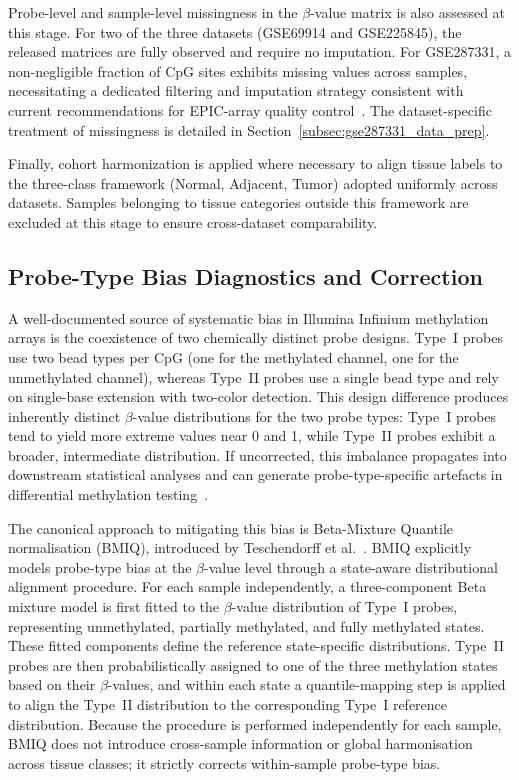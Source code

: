 Probe-level and sample-level missingness in the $\beta$-value matrix is 
also assessed at this stage. For two of the three datasets (GSE69914 and 
GSE225845), the released matrices are fully observed and require no 
imputation. For GSE287331, a non-negligible fraction of CpG sites exhibits 
missing values across samples, necessitating a dedicated filtering and 
imputation strategy consistent with current recommendations for 
EPIC-array quality control~\cite{islam2019_pediatric_dnamm, mansell2019guidance}. The 
dataset-specific treatment of missingness is detailed in 
Section~\ref{subsec:gse287331_data_prep}.

Finally, cohort harmonization is applied where necessary to align tissue 
labels to the three-class framework (Normal, Adjacent, Tumor) adopted 
uniformly across datasets. Samples belonging to tissue categories outside 
this framework are excluded at this stage to ensure cross-dataset 
comparability.

\subsection{Probe-Type Bias Diagnostics and Correction}
\label{subsec:step1}

A well-documented source of systematic bias in Illumina Infinium 
methylation arrays is the coexistence of two chemically distinct probe 
designs. Type~I probes use two bead types per CpG (one for the methylated 
channel, one for the unmethylated channel), whereas Type~II probes use a 
single bead type and rely on single-base extension with two-color 
detection. This design difference produces inherently distinct 
$\beta$-value distributions for the two probe types: Type~I probes tend 
to yield more extreme values near 0 and 1, while Type~II probes exhibit 
a broader, intermediate distribution. If uncorrected, this imbalance 
propagates into downstream statistical analyses and can generate 
probe-type-specific artefacts in differential methylation 
testing~\cite{Teschendorff2013BMIQ, maksimovic2012}.

The canonical approach to mitigating this bias is Beta-Mixture Quantile 
normalisation (BMIQ), introduced by Teschendorff et 
al.~\cite{Teschendorff2013BMIQ}. BMIQ explicitly models probe-type bias 
at the $\beta$-value level through a state-aware distributional alignment 
procedure. For each sample independently, a three-component Beta mixture model is 
first fitted to the $\beta$-value distribution of Type~I probes, 
representing unmethylated, partially methylated, and fully methylated 
states. These fitted components define the reference state-specific 
distributions. Type~II probes are then probabilistically assigned to one 
of the three methylation states based on their $\beta$-values, and within 
each state a quantile-mapping step is applied to align the Type~II 
distribution to the corresponding Type~I reference distribution. Because the procedure is performed independently for each sample, BMIQ 
does not introduce cross-sample information or global harmonisation across 
tissue classes; it strictly corrects within-sample probe-type bias.

